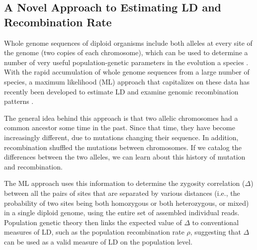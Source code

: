 \documentclass{sig-alternate}
\begin{document}
\subsection{ A Novel Approach to Estimating LD and Recombination Rate}\label{sec:migration}
Whole genome sequences of diploid organisms include both alleles at every site of the genome (two copies of
each chromosome), which can be used to determine a number of very useful population-genetic parameters in the
evolution a species \cite{LDS}. With the rapid accumulation of whole genome sequences from a large number of species, a
maximum likelihood (ML) approach that capitalizes on these data has recently been developed 
to estimate LD and examine genomic recombination patterns \cite{Lynch01112008,MEC:MEC4482}.

The general idea behind this approach is that two allelic chromosomes had a common ancestor some time in the
past. Since that time, they have become 
increasingly different, due to mutations changing their sequence. In 
addition, recombination shuffled the mutations between chromosomes. If we catalog the
differences between the two alleles, we can learn about this history of mutation and recombination.

The ML approach uses this information to determine the zygosity correlation ($\Delta$) between all the pairs
of sites that are separated by various distances (i.e., the probability of two sites being both homozygous or
both heterozygous, or mixed) in a single diploid genome, using the entire set of assembled individual reads. Population genetic
theory then links the expected value of $\Delta$ to conventional measures of LD, such as the population recombination rate $\rho$, suggesting
that $\Delta$ can be used as a valid measure of LD on the population level.



\end{document}
